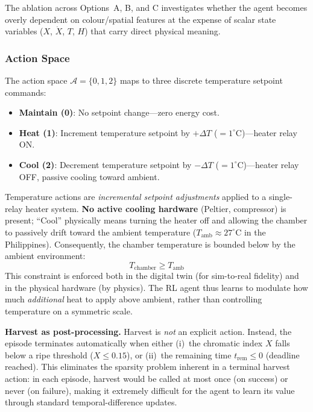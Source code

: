 \documentclass[conference]{IEEEtran}
\begin{document}
    \noindent The ablation across Options~A, B, and C investigates whether the agent becomes overly dependent on colour/spatial features at the expense of scalar state variables ($X$, $\dot{X}$, $T$, $H$) that carry direct physical meaning.

    \subsubsection{Action Space}

    The action space $\mathcal{A} = \{0, 1, 2\}$ maps to three discrete temperature setpoint commands:
    \begin{itemize}
        \item \textbf{Maintain (0)}: No setpoint change---zero energy cost.
        \item \textbf{Heat (1)}: Increment temperature setpoint by $+\Delta T$ ($= 1^{\circ}$C)---heater relay ON.
        \item \textbf{Cool (2)}: Decrement temperature setpoint by $-\Delta T$ ($= 1^{\circ}$C)---heater relay OFF, passive cooling toward ambient.
    \end{itemize}

    \noindent Temperature actions are \emph{incremental setpoint adjustments} applied to a single-relay heater system.  \textbf{No active cooling hardware} (Peltier, compressor) is present; ``Cool'' physically means turning the heater off and allowing the chamber to passively drift toward the ambient temperature ($T_{\text{amb}} \approx 27^{\circ}$C in the Philippines).  Consequently, the chamber temperature is bounded below by the ambient environment:
    \begin{equation}
    T_{\text{chamber}} \geq T_{\text{amb}}
    \label{eq:ambient_floor}
    \end{equation}
    \noindent This constraint is enforced both in the digital twin (for sim-to-real fidelity) and in the physical hardware (by physics).  The RL agent thus learns to modulate how much \emph{additional} heat to apply above ambient, rather than controlling temperature on a symmetric scale.

    \textbf{Harvest as post-processing.}  Harvest is \emph{not} an explicit action.  Instead, the episode terminates automatically when either (i)~the chromatic index $X$ falls below a ripe threshold ($X \leq 0.15$), or (ii)~the remaining time $t_{\text{rem}} \leq 0$ (deadline reached).  This eliminates the sparsity problem inherent in a terminal harvest action: in each episode, harvest would be called at most once (on success) or never (on failure), making it extremely difficult for the agent to learn its value through standard temporal-difference updates.
\end{document}
